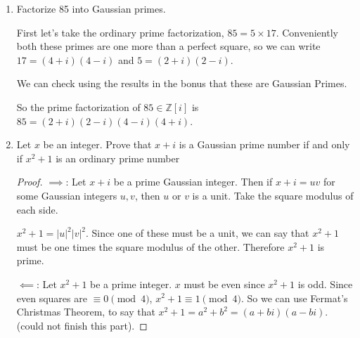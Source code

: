 \documentclass{article}
\begin{document}
\begin{enumerate}
\begin{enumerate}[label= (\alph*)]
\begin{proof}
            Consider $\zeta^{n}=e^{n2i\pi /n}=e^{2i\pi}=1$.

            Therefore $\zeta\alpha=1+\zeta+\zeta^2+\ldots+\zeta^{n-1}=\alpha$.
            
            And so $\alpha(\zeta-1)=0$. So either $\alpha$ or $\zeta-1$ is zero. $\zeta-1$ can only be $0$ if 
            $\zeta=1$, but since $n\ge 2$, this cannot be the case. Therefore $\alpha=0$.


        \end{proof}
\end{enumerate}

\item Factorize 85 into Gaussian primes.

    First let's take the ordinary prime factorization, $85=5\times 17$. 
    Conveniently both these primes are one more than a perfect square, so we can
    write $17=(4+i)(4-i)$ and $5 = (2+i)(2-i)$. 

    We can check using the results in the bonus that these are Gaussian Primes.

    So the prime factorization of $85\in \mathbb{Z}[i]$ is $85=(2+i)(2-i)
    (4-i)(4+i)$.
\item Let $x$ be an integer. Prove that $x + i$ is a Gaussian prime number
if and only if $x^{2} + 1$ is an ordinary prime number 

\begin{proof} 
    $\implies$: Let $x+i$ be a prime Gaussian integer. Then if $x+i=uv$ for some 
    Gaussian integers $u,v$, then $u$ or $v$ is a unit.
    Take the square modulus of each side.

    $x^2+1=|u|^2|v|^2$. Since one of these must be a unit, we can say that $x^2+1$
    must be one times the square modulus of the other. Therefore $x^2+1$ is prime.

    $\impliedby$: Let $x^2+1$ be a prime integer. $x$ must be even since $x^2+1$
    is odd. Since even squares are $\equiv 0\pmod{4}$, $x^2+1\equiv 1\pmod{4}$.
    So we can use Fermat's Christmas Theorem, to say that 
    $x^2+1=a^2+b^2=(a+bi)(a-bi)$. (could not finish this part).

\end{proof}
\end{enumerate}
\end{document}
